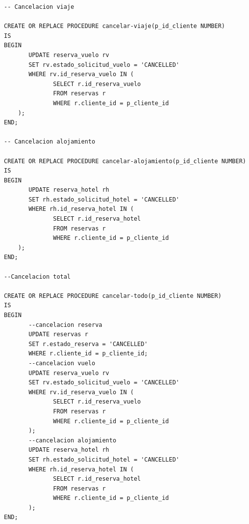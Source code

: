 \documentclass{article}
\begin{document}
\begin{lstlisting}
-- Cancelacion viaje

CREATE OR REPLACE PROCEDURE cancelar-viaje(p_id_cliente NUMBER) 
IS
BEGIN
       UPDATE reserva_vuelo rv
       SET rv.estado_solicitud_vuelo = 'CANCELLED'
       WHERE rv.id_reserva_vuelo IN (
              SELECT r.id_reserva_vuelo
              FROM reservas r
              WHERE r.cliente_id = p_cliente_id
    );
END;

-- Cancelacion alojamiento

CREATE OR REPLACE PROCEDURE cancelar-alojamiento(p_id_cliente NUMBER) 
IS
BEGIN
       UPDATE reserva_hotel rh
       SET rh.estado_solicitud_hotel = 'CANCELLED'
       WHERE rh.id_reserva_hotel IN (
              SELECT r.id_reserva_hotel
              FROM reservas r
              WHERE r.cliente_id = p_cliente_id
    );
END;

--Cancelacion total

CREATE OR REPLACE PROCEDURE cancelar-todo(p_id_cliente NUMBER) 
IS
BEGIN
       --cancelacion reserva
       UPDATE reservas r
       SET r.estado_reserva = 'CANCELLED'
       WHERE r.cliente_id = p_cliente_id;
       --cancelacion vuelo
       UPDATE reserva_vuelo rv
       SET rv.estado_solicitud_vuelo = 'CANCELLED'
       WHERE rv.id_reserva_vuelo IN (
              SELECT r.id_reserva_vuelo
              FROM reservas r
              WHERE r.cliente_id = p_cliente_id
       );
       --cancelacion alojamiento
       UPDATE reserva_hotel rh
       SET rh.estado_solicitud_hotel = 'CANCELLED'
       WHERE rh.id_reserva_hotel IN (
              SELECT r.id_reserva_hotel
              FROM reservas r
              WHERE r.cliente_id = p_cliente_id
       );
END;
\end{lstlisting}
\end{document}
